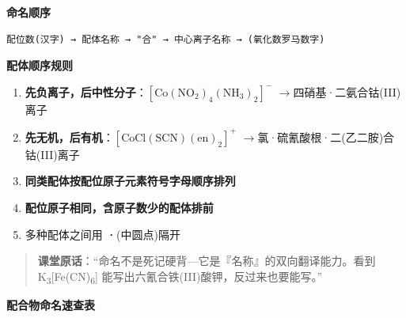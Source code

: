 \documentclass[a4paper,11pt]{ctexart}
\providecommand{\tightlist}{\setlength{\itemsep}{0pt}\setlength{\parskip}{0pt}}
\newcommand{\箭}{\ensuremath{\rightarrow}}
\newcommand{\左箭}{\ensuremath{\leftarrow}}
\newcommand{\上箭}{\ensuremath{\uparrow}}
\newcommand{\下箭}{\ensuremath{\downarrow}}
\newcommand{\衡}{\ensuremath{\rightleftharpoons}}
\newcommand{\双箭}{\ensuremath{\leftrightarrow}}
\newcommand{\约等于}{\ensuremath{\approx}}
\newcommand{\小于等于}{\ensuremath{\leq}}
\newcommand{\大于等于}{\ensuremath{\geq}}
\newcommand{\不等于}{\ensuremath{\neq}}
\newcommand{\西格马}{\ensuremath{\sigma}}
\newcommand{\派}{\ensuremath{\pi}}
\begin{document}
\textbf{命名顺序}

\begin{verbatim}
配位数(汉字) → 配体名称 → "合" → 中心离子名称 → (氧化数罗马数字)
\end{verbatim}

\textbf{配体顺序规则}

\begin{enumerate}
\def\labelenumi{\arabic{enumi}.}
\tightlist
\item
  \textbf{先负离子，后中性分子}：\([\mathrm{Co(NO_2)_4(NH_3)_2}]^-\) \箭 四硝基·二氨合钴(III)离子
\item
  \textbf{先无机，后有机}：\([\mathrm{CoCl(SCN)(en)_2}]^+\) \箭 氯·硫氰酸根·二(乙二胺)合钴(III)离子
\item
  \textbf{同类配体按配位原子元素符号字母顺序排列}
\item
  \textbf{配位原子相同，含原子数少的配体排前}
\item
  多种配体之间用 \textbf{·}(中圆点)隔开
\end{enumerate}

\begin{quote}
\textbf{课堂原话}：``命名不是死记硬背---它是『名称』的双向翻译能力。看到 K\textsubscript{3}{[}Fe(CN)\textsubscript{6}{]} 能写出六氰合铁(III)酸钾，反过来也要能写。''
\end{quote}

\textbf{配合物命名速查表}
\end{document}

